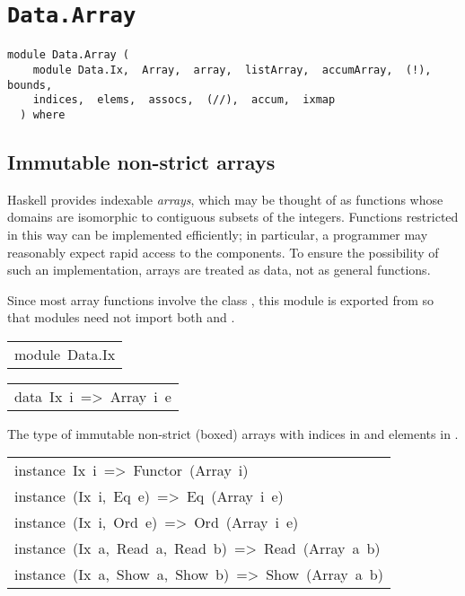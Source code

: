 \chapter{\texttt{Data.Array}}
\label{module:Data.Array}
\haddockbeginheader
{\haddockverb\begin{verbatim}
module Data.Array (
    module Data.Ix,  Array,  array,  listArray,  accumArray,  (!),  bounds, 
    indices,  elems,  assocs,  (//),  accum,  ixmap
  ) where\end{verbatim}}
\haddockendheader

\section{Immutable non-strict arrays
}
Haskell provides indexable \emph{arrays}, which may be thought of as functions
whose domains are isomorphic to contiguous subsets of the integers.
Functions restricted in this way can be implemented efficiently;
in particular, a programmer may reasonably expect rapid access to
the components.  To ensure the possibility of such an implementation,
arrays are treated as data, not as general functions.
\par
Since most array functions involve the class , this module is exported
from  so that modules need not import both  and
.
\par

\begin{haddockdesc}
\item[\begin{tabular}{@{}l}
module\ Data.Ix
\end{tabular}]
\end{haddockdesc}
\begin{haddockdesc}
\item[\begin{tabular}{@{}l}
data\ Ix\ i\ =>\ Array\ i\ e
\end{tabular}]\haddockbegindoc
The type of immutable non-strict (boxed) arrays
 with indices in  and elements in .
\par

\end{haddockdesc}
\begin{haddockdesc}
\item[\begin{tabular}{@{}l}
instance\ Ix\ i\ =>\ Functor\ (Array\ i)\\instance\ (Ix\ i,\ Eq\ e)\ =>\ Eq\ (Array\ i\ e)\\instance\ (Ix\ i,\ Ord\ e)\ =>\ Ord\ (Array\ i\ e)\\instance\ (Ix\ a,\ Read\ a,\ Read\ b)\ =>\ Read\ (Array\ a\ b)\\instance\ (Ix\ a,\ Show\ a,\ Show\ b)\ =>\ Show\ (Array\ a\ b)
\end{tabular}]
\end{haddockdesc}
